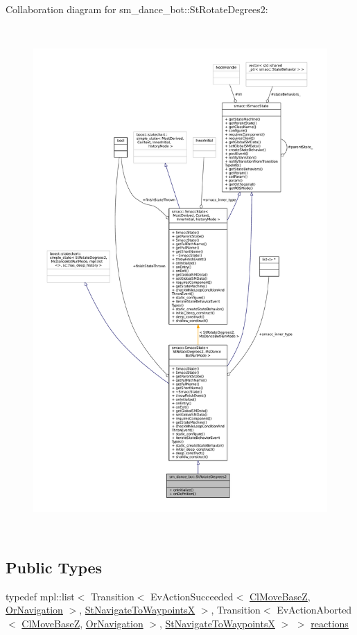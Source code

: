 Collaboration diagram for sm\+\_\+dance\+\_\+bot\+:\+:St\+Rotate\+Degrees2\+:
\nopagebreak
\begin{figure}[H]
\begin{center}
\leavevmode
\includegraphics[height=550pt]{structsm__dance__bot_1_1StRotateDegrees2__coll__graph}
\end{center}
\end{figure}
\subsection*{Public Types}
\begin{DoxyCompactItemize}
\item 
typedef mpl\+::list$<$ Transition$<$ Ev\+Action\+Succeeded$<$ \hyperlink{classmove__base__z__client_1_1ClMoveBaseZ}{Cl\+Move\+BaseZ}, \hyperlink{classsm__dance__bot_1_1OrNavigation}{Or\+Navigation} $>$, \hyperlink{structsm__dance__bot_1_1StNavigateToWaypointsX}{St\+Navigate\+To\+WaypointsX} $>$, Transition$<$ Ev\+Action\+Aborted$<$ \hyperlink{classmove__base__z__client_1_1ClMoveBaseZ}{Cl\+Move\+BaseZ}, \hyperlink{classsm__dance__bot_1_1OrNavigation}{Or\+Navigation} $>$, \hyperlink{structsm__dance__bot_1_1StNavigateToWaypointsX}{St\+Navigate\+To\+WaypointsX} $>$ $>$ \hyperlink{structsm__dance__bot_1_1StRotateDegrees2_ac78a9a21e3b11060f12b8403669e3dda}{reactions}
\end{DoxyCompactItemize}
